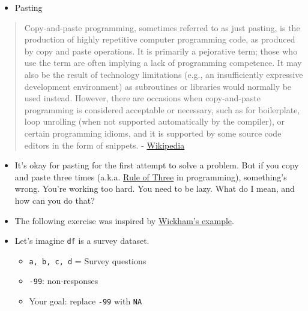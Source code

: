 \documentclass[
  letterpaper,
  DIV=11,
  numbers=noendperiod]{scrreprt}
\providecommand{\tightlist}{%
  \setlength{\itemsep}{0pt}\setlength{\parskip}{0pt}}\usepackage{longtable,booktabs,array}
\begin{document}
\begin{itemize}
\tightlist
\item
  Pasting
\end{itemize}

\begin{quote}
Copy-and-paste programming, sometimes referred to as just pasting, is
the production of highly repetitive computer programming code, as
produced by copy and paste operations. It is primarily a pejorative
term; those who use the term are often implying a lack of programming
competence. It may also be the result of technology limitations (e.g.,
an insufficiently expressive development environment) as subroutines or
libraries would normally be used instead. However, there are occasions
when copy-and-paste programming is considered acceptable or necessary,
such as for boilerplate, loop unrolling (when not supported
automatically by the compiler), or certain programming idioms, and it is
supported by some source code editors in the form of snippets. -
\href{https://en.wikipedia.org/wiki/Copy-and-paste_programming}{Wikipedia}
\end{quote}

\begin{itemize}
\item
  It's okay for pasting for the first attempt to solve a problem. But if
  you copy and paste three times (a.k.a.
  \href{https://en.wikipedia.org/wiki/Rule_of_three_(computer_programming)}{Rule
  of Three} in programming), something's wrong. You're working too hard.
  You need to be lazy. What do I mean, and how can you do that?
\item
  The following exercise was inspired by
  \href{http://adv-r.had.co.nz/Functional-programming.html}{Wickham's
  example}.
\item
  Let's imagine \texttt{df} is a survey dataset.

  \begin{itemize}
  \item
    \texttt{a,\ b,\ c,\ d} = Survey questions
  \item
    \texttt{-99}: non-responses
  \item
    Your goal: replace \texttt{-99} with \texttt{NA}
  \end{itemize}
\end{itemize}
\end{document}
